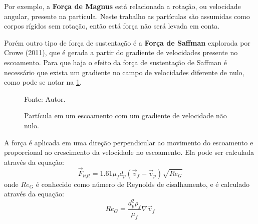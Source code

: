 \begin{itemize}
        Por exemplo, a \textbf{Força de Magnus} está relacionada a rotação, ou velocidade angular, presente na partícula.
        Neste trabalho as partículas são assumidas como corpos rígidos sem rotação, então está força não será levada em conta.

        Porém outro tipo de força de sustentação é a \textbf{Força de Saffman} explorada por Crowe (2011)\cite{crowe}, que é gerada a partir do gradiente de velocidades presente no escoamento.
        Para que haja o efeito da força de sustentação de Saffman é necessário que exista um gradiente no campo de velocidades diferente de nulo, como pode se notar na \ref{saffman}.
        \begin{figure}[H]
            \centering
             {\raggedleft \scriptsize Fonte: Autor.}
            \caption{Partícula em um escoamento com um gradiente de velocidade não nulo.}
            \label{saffman}
        \end{figure}

        A força é aplicada em uma direção perpendicular ao movimento do escoamento e proporcional ao crescimento da velocidade no escoamento.
        Ela pode ser calculada através da equação:
        \begin{equation}
            \vec{F}_{lift} = 1.61 \mu_f d_p \left(\vec{v}_{f} - \vec{v}_{p} \right) \sqrt{{Re}_G}
            \label{lift}
        \end{equation}
        onde $Re_{G}$ é conhecido como número de Reynolds de cisalhamento, e é calculado através da equação:
        \begin{equation}
            Re_G = \dfrac{d_p^2 \rho_f}{\mu_f} \nabla \vec{v}_f
            \label{reg}
        \end{equation}


\end{itemize}
